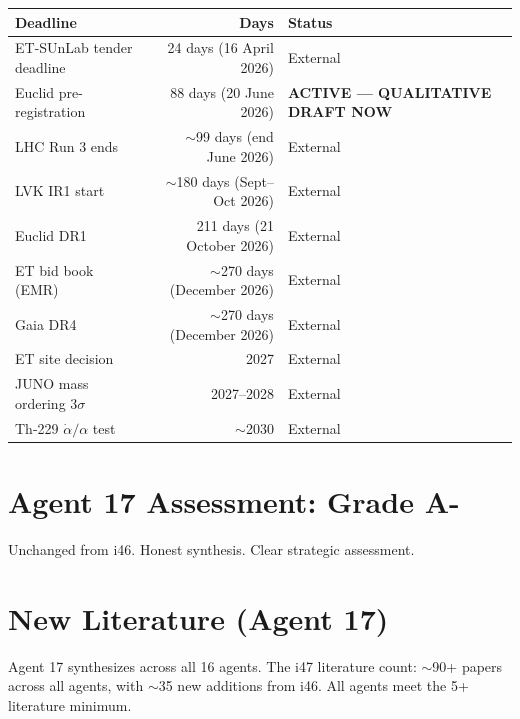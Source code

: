 \documentclass[11pt,a4paper]{article}
\begin{document}
\begin{center}
\begin{tabular}{lrl}
\toprule
\textbf{Deadline} & \textbf{Days} & \textbf{Status} \\
\midrule
ET-SUnLab tender deadline & 24 days (16 April 2026) & External \\
Euclid pre-registration & 88 days (20 June 2026) & \textbf{ACTIVE --- QUALITATIVE DRAFT NOW} \\
LHC Run 3 ends & $\sim$99 days (end June 2026) & External \\
LVK IR1 start & $\sim$180 days (Sept--Oct 2026) & External \\
Euclid DR1 & 211 days (21 October 2026) & External \\
ET bid book (EMR) & $\sim$270 days (December 2026) & External \\
Gaia DR4 & $\sim$270 days (December 2026) & External \\
ET site decision & 2027 & External \\
JUNO mass ordering $3\sigma$ & 2027--2028 & External \\
Th-229 $\dot{\alpha}/\alpha$ test & $\sim$2030 & External \\
\bottomrule
\end{tabular}
\end{center}

\section{Agent 17 Assessment: Grade A-}

Unchanged from i46. Honest synthesis. Clear strategic assessment.

\section{New Literature (Agent 17)}

Agent 17 synthesizes across all 16 agents. The i47 literature count: $\sim$90+ papers across all agents, with $\sim$35 new additions from i46. All agents meet the 5+ literature minimum.
\end{document}

